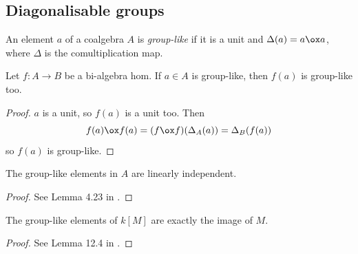 \subsection{Diagonalisable groups}


\begin{definition}
  \label{0-grp-like}
  \uses{}
  \leanok

  An element $a$ of a coalgebra $A$ is \emph{group-like} if it is a unit and $\Delta(a) = a \ox a$, where $\Delta$ is the comultiplication map.
\end{definition}


\begin{lemma}
  \label{0-grp-like-map}
  \leanok

  Let $f : A \to B$ be a bi-algebra hom. If $a \in A$ is group-like, then $f(a)$ is group-like too.
\end{lemma}
\begin{proof}
  \uses{}
  \leanok

  $a$ is a unit, so $f(a)$ is a unit too. Then
  \[
    f(a) \ox f(a) = (f \ox f)(\Delta_A(a)) = \Delta_B(f(a))
  \]
  so $f(a)$ is group-like.
\end{proof}


\begin{lemma}
  \label{0-grp-like-lin-indep}
  \leanok

  The group-like elements in $A$ are linearly independent.
\end{lemma}
\begin{proof}
  \leanok

  See Lemma 4.23 in \cite{Milne_2017}.
\end{proof}


\begin{lemma}
  \label{0-grp-like-grp-alg}
  \leanok

  The group-like elements of $k[M]$ are exactly the image of $M$.
\end{lemma}
\begin{proof}
  \leanok

  See Lemma 12.4 in \cite{Milne_2017}.
\end{proof}


